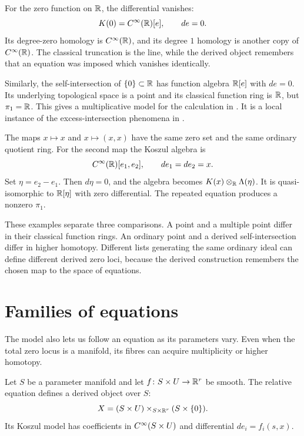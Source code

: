 \begin{example}
For the zero function on $\mathbb{R}$, the differential vanishes:
\[
 K(0)=C^\infty(\mathbb{R})[e],\qquad de=0.
\]
Its degree-zero homology is $C^\infty(\mathbb{R})$, and its degree $1$
homology is another copy of $C^\infty(\mathbb{R})$. The classical truncation is
the line, while the derived object remembers that an equation was imposed
which vanishes identically.

Similarly, the self-intersection of $\{0\}\subset\mathbb{R}$ has function algebra
$\mathbb{R}[e]$ with $de=0$. Its underlying topological space
is a point and its classical function ring is $\mathbb{R}$, but $\pi_1=\mathbb{R}$.
This gives a multiplicative model for the calculation in
. It is a local instance
of the excess-intersection phenomena in
\citet[Example~2.7]{Spivak_Derived_Smooth_Manifolds}.
\end{example}

\begin{example}
The maps $x\mapsto x$ and $x\mapsto(x,x)$ have the same zero set and
the same ordinary quotient ring. For the second map the Koszul algebra is
\[
 C^\infty(\mathbb{R})[e_1,e_2],
 \qquad de_1=de_2=x.
\]
Set $\eta=e_2-e_1$. Then $d\eta=0$, and the algebra
becomes $K(x)\otimes_{\mathbb{R}}\Lambda(\eta)$. It is quasi-isomorphic to
$\mathbb{R}[\eta]$ with zero differential. The repeated equation produces a
nonzero $\pi_1$.
\end{example}

These examples separate three comparisons. A point and a multiple point
differ in their classical function rings. An ordinary point and a derived
self-intersection differ in higher homotopy. Different lists generating
the same ordinary ideal can define different derived zero loci, because
the derived construction remembers the chosen map to the space of equations.

\section{Families of equations}

The model also lets us follow an equation as its parameters vary.
Even when the total zero locus is a manifold, its fibres can acquire
multiplicity or higher homotopy.

Let $S$ be a parameter manifold and let
$f\colon S\times U\to\mathbb{R}^r$ be smooth. The relative equation defines a
derived object over $S$:
\[
 X=(S\times U)\times_{S\times\mathbb{R}^r}(S\times\{0\}).
\]
Its Koszul model has coefficients in $C^\infty(S\times U)$ and
differential $de_i=f_i(s,x)$.

